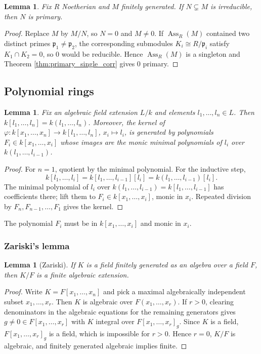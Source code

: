 \documentclass[12pt]{article}
\theoremstyle{plain}
\newtheorem{lemma}[thm]{Lemma}
\theoremstyle{definition}
\begin{document}
\begin{lemma}
Fix $R$ Noetherian and $M$ finitely generated. If $N\subsetneq M$ is irreducible, then $N$ is primary.
\end{lemma}
\begin{proof}
Replace $M$ by $M/N$, so $N=0$ and $M\ne 0$. If $\operatorname{Ass}_R(M)$ contained two distinct primes $\mathfrak{p}_1\ne\mathfrak{p}_2$, the corresponding submodules $K_i\cong R/\mathfrak{p}_i$ satisfy $K_1\cap K_2=0$, so $0$ would be reducible. Hence $\operatorname{Ass}_R(M)$ is a singleton and Theorem \ref{thm:primary_single_corr} gives $0$ primary.
\end{proof}

\subsection{Polynomial rings}

\begin{lemma}\label{lem:ext_corr}
Fix an algebraic field extension $L/k$ and elements $l_1,\ldots,l_n\in L$. Then $k[l_1,\ldots,l_n]=k(l_1,\ldots,l_n)$. Moreover, the kernel of $\varphi:k[x_1,\ldots,x_n]\to k[l_1,\ldots,l_n]$, $x_i\mapsto l_i$, is generated by polynomials $F_i\in k[x_1,\ldots,x_i]$ whose images are the monic minimal polynomials of $l_i$ over $k(l_1,\ldots,l_{i-1})$.
\end{lemma}
\begin{proof}
For $n=1$, quotient by the minimal polynomial. For the inductive step,
\[
k[l_1,\ldots,l_i]=k[l_1,\ldots,l_{i-1}][l_i]=k(l_1,\ldots,l_{i-1})[l_i].
\]
The minimal polynomial of $l_i$ over $k(l_1,\ldots,l_{i-1})=k[l_1,\ldots,l_{i-1}]$ has coefficients there; lift them to $F_i\in k[x_1,\ldots,x_i]$, monic in $x_i$. Repeated division by $F_n,F_{n-1},\ldots,F_1$ gives the kernel.
\end{proof}

The polynomial $F_i$ must be in $k[x_1,\ldots,x_i]$ and monic in $x_i$.

\subsubsection*{Zariski's lemma}

\begin{lemma}[Zariski]
If $K$ is a field finitely generated as an algebra over a field $F$, then $K/F$ is a finite algebraic extension.
\end{lemma}
\begin{proof}
Write $K=F[x_1,\ldots,x_n]$ and pick a maximal algebraically independent subset $x_1,\ldots,x_r$. Then $K$ is algebraic over $F(x_1,\ldots,x_r)$. If $r>0$, clearing denominators in the algebraic equations for the remaining generators gives $g\ne 0\in F[x_1,\ldots,x_r]$ with $K$ integral over $F[x_1,\ldots,x_r]_g$. Since $K$ is a field, $F[x_1,\ldots,x_r]_g$ is a field, which is impossible for $r>0$. Hence $r=0$, $K/F$ is algebraic, and finitely generated algebraic implies finite.
\end{proof}
\end{document}
